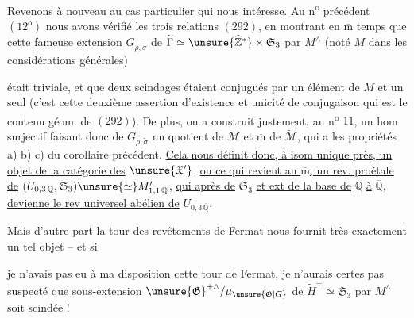 Revenons à nouveau au cas particulier qui nous intéresse. Au n\textsuperscript{o} précédent $(12^{\mathrm o})$ nous avons vérifié les trois relations $(292)$, en montrant en $\overline{\mathrm m}$ temps que cette fameuse extension $G_{\rho,\widetilde\sigma}$ de $\widetilde\Gamma\simeq\unsure{\widehat{\mathbb Z}^{*}}\times\mathfrak S_3$ par $M^{\wedge}$ (noté $M$ dans les considérations générales)



était triviale, et que deux scindages étaient conjugués par un élément de $M$ et un seul (c'est cette deuxième assertion d'existence et unicité de conjugaison qui est le contenu géom. de $(292)$).
De plus, on a  construit justement, au n\textsuperscript{o} $11$, un hom surjectif
faisant donc de $G_{\rho,\widetilde\sigma}$ un quotient de $\mathcal M$ et $\overline{\mathrm m}$ de $\widetilde{\mathcal M}$, qui a les propriétés a) b) c) du corollaire précédent. \uline{Cela nous définit donc, à isom unique près, un objet de la catégorie des} $\unsure{\mathfrak X'}$,
\uline{ou ce qui revient au $\overline{\mathrm m}$, un rev. proétale de} $(U_{0,3\,\mathbb Q},\mathfrak S_3)\unsure{\simeq}M'_{1,1\,\mathbb Q}$,
\uline{qui après   de} $\mathfrak S_3$ \uline{et ext de la base de} $\mathbb Q$ \uline{à} $\overline{\mathbb Q}$, \uline{devienne le rev universel abélien de} $U_{0,3\,\overline{\mathbb Q}}$.

Mais d'autre part la tour des revêtements de Fermat nous fournit très exactement un tel objet -- et si



je n'avais pas eu à ma disposition cette tour de Fermat, je n'aurais certes pas suspecté que  sous-extension $\unsure{\mathfrak G}^{+\wedge}/\mu_{\unsure{\mathfrak G|G}}$  de $\widetilde H^+\simeq\mathfrak S_3$ par $M^{\wedge}$ soit scindée !

